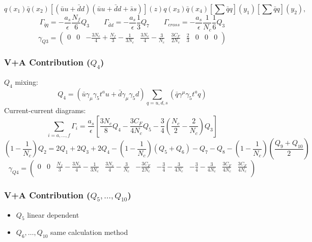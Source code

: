 \documentclass{beamer}
\begin{document}
\begin{frame}
\begin{equation*}
	q(x_1) \bar q(x_2) [( \bar u u + \bar d d  ) ( \bar u u + \bar d d + \bar s s  )](z) q(x_3) \bar q(x_4) [\sum \bar q q](y_1) [\sum \bar q q](y_2),
\end{equation*}
\small
\begin{equation*}
	\Gamma_{\bar qq} = - \frac{a_s}{\epsilon} \frac{N_f}{6} Q_3 \qquad \Gamma_{\bar dd} = - \frac{a_s}{\epsilon}\frac{1}{3} Q_7 \qquad \Gamma_{cross} = -\frac{a_s}{\epsilon} \frac{1}{N_c} \frac{1}{6} Q_3
\end{equation*}
\begin{equation*}
	\gamma_{Q3} = 
	(
	\begin{matrix}
		0 & 0 & -\frac{3N_c}{4}+\frac{N_f}{3}-\frac{1}{3N_c} & \frac{3N_c}{4} - \frac{3}{N_c} & \frac{3C_F}{2 N_c} & \frac{2}{3} & 0 & 0 & 0
	\end{matrix}
	)
\end{equation*}
\end{frame}

\begin{frame}
\frametitle{V+A Contribution ($Q_4$)}
$Q_4$ mixing:
\begin{equation*}
	Q_4 = (\bar u \gamma_\mu \gamma_5 t^a u + \bar d \gamma_\mu \gamma_5 d) \sum_{q=u,d,s} (\bar q \gamma^\mu \gamma_5 t^a q)
\end{equation*}
Current-current diagrams:
\begin{equation*}
	\sum_{i=a,\ldots,f}\Gamma_i = \frac{a_s}{\epsilon}\left[\frac{3N_c}{8}Q_4 -\frac{3C_F}{4N_c}Q_5 -\frac{3}{4}\left(\frac{N_c}{2}-\frac{2}{N_c}\right)Q_3\right]
\end{equation*}
\tiny
\begin{equation*}
	(1-\frac{1}{N_c}) Q_2 = 2Q_1 + 2Q_3 + 2Q_4 -\left(1-\frac{1}{N_c}\right)(Q_5 + Q_6)- Q_7 -Q_8 -\left(1-\frac{1}{N_c}\right)\left(\frac{Q_9 + Q_{10}}{2}\right)
\end{equation*}
\begin{equation*}
	\gamma_{Q4} = 
	\left(
	\begin{matrix}
		0 & 0 & \frac{N_f}{3}-\frac{3N_c}{4}-\frac{1}{3N_c} & \frac{3N_c}{4}-\frac{3}{N_c} & -\frac{3C_F}{2N_c} & -\frac{3}{4}-\frac{3}{4N_c} & -\frac{3}{4}-\frac{3}{4N_c} & \frac{3C_F}{4N_c} & \frac{3C_F}{4N_c} \\
	\end{matrix}
	\right
	     )
\end{equation*}
\end{frame}

\begin{frame}
\frametitle{V+A Contribution ($Q_5, \ldots, Q_{10}$)}
\begin{itemize}
\item $Q_5$ linear dependent 
\item $Q_6, \ldots, Q_{10}$ same calculation method
\end{itemize}
\end{frame}
\end{document}
